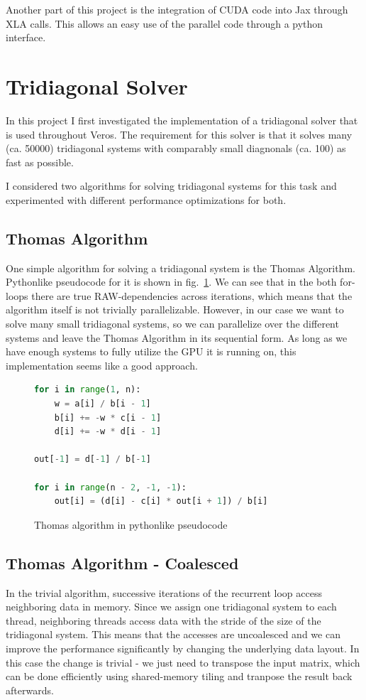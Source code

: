\documentclass[a4paper,oneside]{memoir}
\begin{document}
Another part of this project is the integration of CUDA code into Jax through XLA calls.
This allows an easy use of the parallel code through a python interface.


\section{Tridiagonal Solver}
In this project I first investigated the implementation of a tridiagonal solver that is used throughout Veros. 
The requirement for this solver is that it solves many (ca. 50000) tridiagonal systems with comparably small diagnonals (ca. 100) as fast as possible.

I considered two algorithms for solving tridiagonal systems for this task and experimented with different performance optimizations for both.

\subsection{Thomas Algorithm}
One simple algorithm for solving a tridiagonal system is the Thomas Algorithm.
Pythonlike pseudocode for it is shown in fig.~\ref{fig:thomas}.
We can see that in the both for-loops there are true RAW-dependencies across iterations, which means that the algorithm itself is not trivially parallelizable.
However, in our case we want to solve many small tridiagonal systems, so we can parallelize over the different systems and leave the Thomas Algorithm in its sequential form.
As long as we have enough systems to fully utilize the GPU it is running on, this implementation seems like a good approach.

\begin{figure}[hbtp]
    \caption{Thomas algorithm in pythonlike pseudocode}
    \label{fig:thomas}
    \begin{lstlisting}[language=python,frame=single]
for i in range(1, n):
    w = a[i] / b[i - 1]
    b[i] += -w * c[i - 1]
    d[i] += -w * d[i - 1]

out[-1] = d[-1] / b[-1]

for i in range(n - 2, -1, -1):
    out[i] = (d[i] - c[i] * out[i + 1]) / b[i]
    \end{lstlisting}
\end{figure}


\subsection{Thomas Algorithm - Coalesced}
\label{sec:thomas_coal}
In the trivial algorithm, successive iterations of the recurrent loop access neighboring data in memory.
Since we assign one tridiagonal system to each thread, neighboring threads access data with the stride of the size of the tridiagonal system. This means that the accesses are uncoalesced and we can improve the performance significantly by changing the underlying data layout. 
In this case the change is trivial - we just need to transpose the input matrix, which can be done efficiently using shared-memory tiling and tranpose the result back afterwards. 
\end{document}
